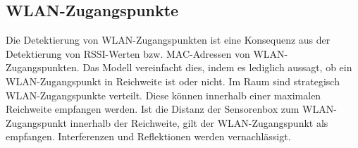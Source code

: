 \subsection{WLAN-Zugangspunkte}
Die Detektierung von WLAN-Zugangspunkten ist eine Konsequenz aus der Detektierung von RSSI-Werten bzw. MAC-Adressen von WLAN-Zugangspunkten.
Das Modell vereinfacht dies, indem es lediglich aussagt, ob ein WLAN-Zugangspunkt in Reichweite ist oder nicht.
\newline
\newline
Im Raum sind strategisch WLAN-Zugangspunkte verteilt.
Diese können innerhalb einer maximalen Reichweite empfangen werden.
Ist die Distanz der Sensorenbox zum WLAN-Zugangspunkt innerhalb der Reichweite, gilt der WLAN-Zugangspunkt als empfangen.
Interferenzen und Reflektionen werden vernachlässigt.